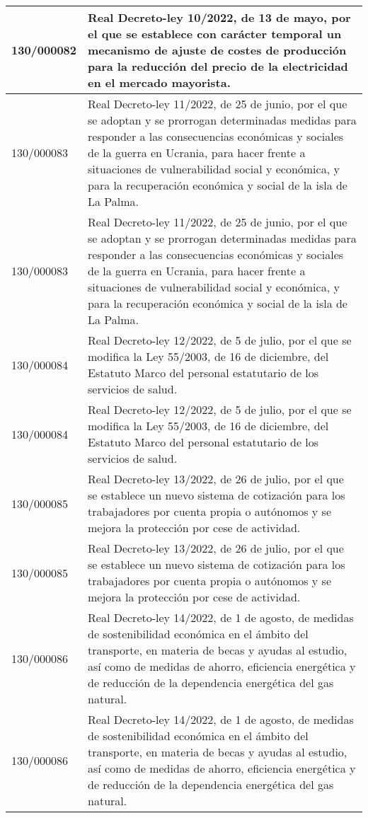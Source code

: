 {\begin{table}[H]
\begin{center}
\begin{tabularx}{\linewidth}{| l | X |}
\hline
130/000082 & Real Decreto-ley 10/2022, de 13 de mayo, por el que se establece con carácter temporal un mecanismo de ajuste de costes de producción para la reducción del precio de la electricidad en el mercado mayorista. \\
\hline
130/000083 & Real Decreto-ley 11/2022, de 25 de junio, por el que se adoptan y se prorrogan determinadas medidas para responder a las consecuencias económicas y sociales de la guerra en Ucrania, para hacer frente a situaciones de vulnerabilidad social y económica, y para la recuperación económica y social de la isla de La Palma. \\
\hline
130/000083 & Real Decreto-ley 11/2022, de 25 de junio, por el que se adoptan y se prorrogan determinadas medidas para responder a las consecuencias económicas y sociales de la guerra en Ucrania, para hacer frente a situaciones de vulnerabilidad social y económica, y para la recuperación económica y social de la isla de La Palma. \\
\hline
130/000084 & Real Decreto-ley 12/2022, de 5 de julio, por el que se modifica la Ley 55/2003, de 16 de diciembre, del Estatuto Marco del personal estatutario de los servicios de salud. \\
\hline
130/000084 & Real Decreto-ley 12/2022, de 5 de julio, por el que se modifica la Ley 55/2003, de 16 de diciembre, del Estatuto Marco del personal estatutario de los servicios de salud. \\
\hline
130/000085 & Real Decreto-ley 13/2022, de 26 de julio, por el que se establece un nuevo sistema de cotización para los trabajadores por cuenta propia o autónomos y se mejora la protección por cese de actividad. \\
\hline
130/000085 & Real Decreto-ley 13/2022, de 26 de julio, por el que se establece un nuevo sistema de cotización para los trabajadores por cuenta propia o autónomos y se mejora la protección por cese de actividad. \\
\hline
130/000086 & Real Decreto-ley 14/2022, de 1 de agosto, de medidas de sostenibilidad económica en el ámbito del transporte, en materia de becas y ayudas al estudio, así como de medidas de ahorro, eficiencia energética y de reducción de la dependencia energética del gas natural. \\
\hline
130/000086 & Real Decreto-ley 14/2022, de 1 de agosto, de medidas de sostenibilidad económica en el ámbito del transporte, en materia de becas y ayudas al estudio, así como de medidas de ahorro, eficiencia energética y de reducción de la dependencia energética del gas natural. \\

\end{tabularx}
\end{center}
\end{table}}
